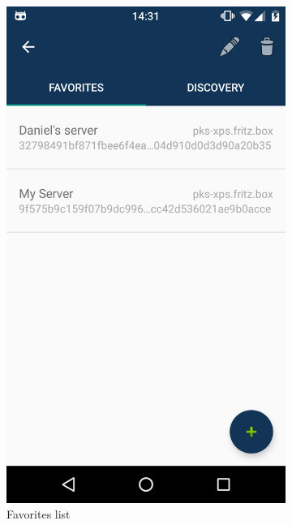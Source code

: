 \begin{figure}
\begin{subfigure}{0.24\textwidth}
        \includegraphics[width=\linewidth]{resources/favorites.png}
        \caption{Favorites list}
        \label{favorites-list}
    \end{subfigure}
    \begin{subfigure}{0.24\textwidth}

\end{subfigure}
\end{figure}
